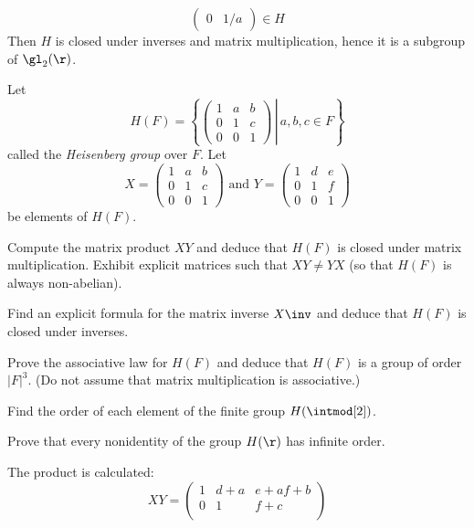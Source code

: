 \begin{problems}
\begin{solalph}
$$\begin{pmatrix}
            0 & 1/a
        \end{pmatrix} \in H$$
        Then $H$ is closed under inverses and matrix multiplication, hence it is a subgroup of $\gl_2(\r)$.
    \end{solalph}
    \item 
    \label{ex1.4.11}
    Let
    $$H(F) = \left\{\left.
    \begin{pmatrix}
        1 & a & b \\
        0 & 1 & c \\
        0 & 0 & 1
    \end{pmatrix}\,\right|\, a, b, c \in F\right\}$$
    called the \textit{Heisenberg group} over $F$. Let
    $$X = 
    \begin{pmatrix}
        1 & a & b \\
        0 & 1 & c \\
        0 & 0 & 1
    \end{pmatrix} \text{ and }Y = 
    \begin{pmatrix}
        1 & d & e \\
        0 & 1 & f \\
        0 & 0 & 1
    \end{pmatrix}$$
    be elements of $H(F)$.
    \begin{problems}
        \item Compute the matrix product $XY$ and deduce that $H(F)$ is closed under matrix multiplication. Exhibit explicit matrices such that $XY \neq YX$ (so that $H(F)$ is always non-abelian).
        \item Find an explicit formula for the matrix inverse $X\inv$ and deduce that $H(F)$ is closed under inverses.
        \item Prove the associative law for $H(F)$ and deduce that $H(F)$ is a group of order $|F|^3$. (Do not assume that matrix multiplication is associative.)
        \item Find the order of each element of the finite group $H(\intmod[2])$.
        \item Prove that every nonidentity of the group $H(\r)$ has infinite order.
    \end{problems}
    \begin{solalph}
        \item The product is calculated:
        $$XY = 
        \begin{pmatrix}
            1 & d + a & e + af + b \\
            0 & 1 & f + c \\

\end{pmatrix}$$
\end{solalph}
\end{problems}
